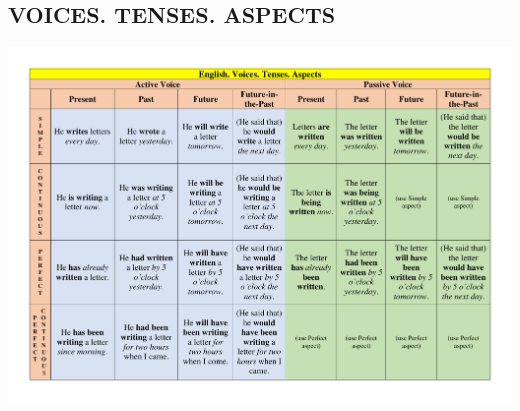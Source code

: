 \documentclass[main.tex]{subfiles}
\begin{document}
\subsection{VOICES. TENSES. ASPECTS}

{\parindent0pt\includegraphics[width=\textwidth,page=1,trim={0.5in 0in 0.49in 0in},clip=true]{EnglishTensesAspectsVoicesPoster.pdf}}
\end{document}
